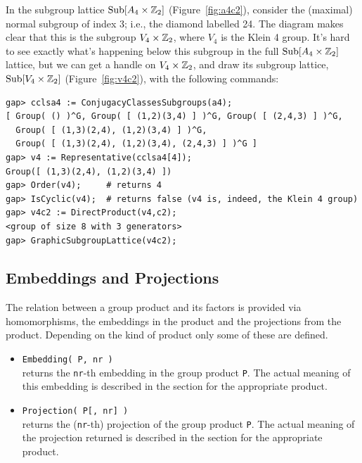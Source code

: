 \begin{enumerate}
\noindent In the subgroup lattice $\mathrm{Sub}[A_4 \times \mathbb{Z}_2]$ (Figure~\ref{fig:a4c2}), 
consider the (maximal) normal subgroup of index 3; 
i.e., the diamond labelled 24.  
The diagram makes clear that this is the subgroup 
$V_4 \times \mathbb{Z}_2$, where $V_4$ is the Klein 4 group.  
It's hard to see exactly what's happening below this subgroup in the full 
$\mathrm{Sub}[A_4 \times \mathbb{Z}_2]$ lattice,
but we can get a handle on $V_4 \times \mathbb{Z}_2$, and draw its subgroup lattice, 
$\mathrm{Sub}[V_4 \times \mathbb{Z}_2]$ (Figure~\ref{fig:v4c2}), with the following commands:
{\codesize
\begin{verbatim}
gap> cclsa4 := ConjugacyClassesSubgroups(a4);
[ Group( () )^G, Group( [ (1,2)(3,4) ] )^G, Group( [ (2,4,3) ] )^G, 
  Group( [ (1,3)(2,4), (1,2)(3,4) ] )^G, 
  Group( [ (1,3)(2,4), (1,2)(3,4), (2,4,3) ] )^G ]
gap> v4 := Representative(cclsa4[4]);
Group([ (1,3)(2,4), (1,2)(3,4) ])
gap> Order(v4);     # returns 4 
gap> IsCyclic(v4);  # returns false (v4 is, indeed, the Klein 4 group)
gap> v4c2 := DirectProduct(v4,c2);
<group of size 8 with 3 generators>
gap> GraphicSubgroupLattice(v4c2);
\end{verbatim}}
\end{enumerate}



\newpage


\newpage 

\subsection{Embeddings and Projections}
\label{sec:embedd-proj-group}
The relation between a group product and its factors is provided via homomorphisms, the embeddings in
the product and the projections from the product. Depending on the kind of product only some of these are
defined.
\begin{itemize}
\item {\tt Embedding( P, nr )}\\[2pt]
returns the {\tt nr}-th embedding in the group product {\tt P}. 
The actual meaning of this embedding is described in the section for the appropriate product.
\item {\tt Projection( P[, nr] )}\\[2pt]
returns the ({\tt nr}-th) projection of the group product {\tt P}. 
The actual meaning of the projection returned is described in the section for the appropriate product.
\end{itemize}
\subsectionspace

